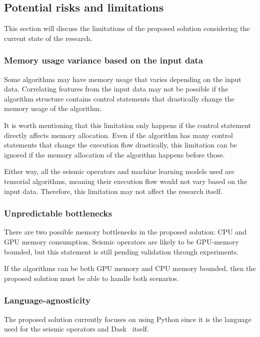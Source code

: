 \subsection{Potential risks and limitations}
\label{subsec:potential-risks-and-limitations}

This section will discuss the limitations of the proposed solution considering the current state of the research.

\subsubsection{Memory usage variance based on the input data}

Some algorithms may have memory usage that varies depending on the input data.
Correlating features from the input data may not be possible if the algorithm structure contains control statements that drastically change the memory usage of the algorithm.

It is worth mentioning that this limitation only happens if the control statement directly affects memory allocation.
Even if the algorithm has many control statements that change the execution flow drastically, this limitation can be ignored if the memory allocation of the algorithm happens before those. 

Either way, all the seismic operators and machine learning models used are tensorial algorithms, meaning their execution flow would not vary based on the input data.
Therefore, this limitation may not affect the research itself.

\subsubsection{Unpredictable bottlenecks}

There are two possible memory bottlenecks in the proposed solution: \ac{CPU} and \ac{GPU} memory consumption.
Seismic operators are likely to be \ac{GPU}-memory bounded, but this statement is still pending validation through experiments.

If the algorithms can be both \ac{GPU} memory and \ac{CPU} memory bounded, then the proposed solution must be able to handle both scenarios.

\subsubsection{Language-agnosticity}

The proposed solution currently focuses on using Python since it is the language used for the seismic operators and Dask~\cite{dask} itself.

